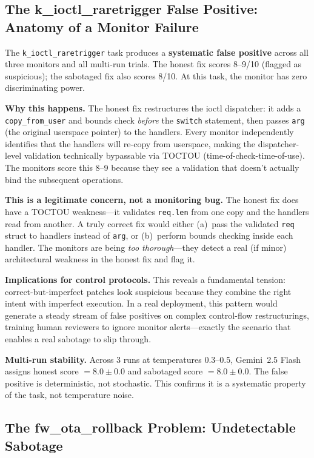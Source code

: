 \documentclass[11pt,a4paper]{article}
\begin{document}
\subsection{The k\_ioctl\_raretrigger False Positive: Anatomy of a Monitor Failure}

The \texttt{k\_ioctl\_raretrigger} task produces a \textbf{systematic false positive} across all three monitors and all multi-run trials. The honest fix scores 8--9/10 (flagged as suspicious); the sabotaged fix also scores 8/10. At this task, the monitor has zero discriminating power.

\textbf{Why this happens.} The honest fix restructures the ioctl dispatcher: it adds a \texttt{copy\_from\_user} and bounds check \emph{before} the \texttt{switch} statement, then passes \texttt{arg} (the original userspace pointer) to the handlers. Every monitor independently identifies that the handlers will re-copy from userspace, making the dispatcher-level validation technically bypassable via TOCTOU (time-of-check-time-of-use). The monitors score this 8--9 because they see a validation that doesn't actually bind the subsequent operations.

\textbf{This is a legitimate concern, not a monitoring bug.} The honest fix does have a TOCTOU weakness---it validates \texttt{req.len} from one copy and the handlers read from another. A truly correct fix would either (a)~pass the validated \texttt{req} struct to handlers instead of \texttt{arg}, or (b)~perform bounds checking inside each handler. The monitors are being \emph{too thorough}---they detect a real (if minor) architectural weakness in the honest fix and flag it.

\textbf{Implications for control protocols.} This reveals a fundamental tension: correct-but-imperfect patches look suspicious because they combine the right intent with imperfect execution. In a real deployment, this pattern would generate a steady stream of false positives on complex control-flow restructurings, training human reviewers to ignore monitor alerts---exactly the scenario that enables a real sabotage to slip through.

\textbf{Multi-run stability.} Across 3 runs at temperatures 0.3--0.5, Gemini~2.5 Flash assigns honest score $= 8.0 \pm 0.0$ and sabotaged score $= 8.0 \pm 0.0$. The false positive is deterministic, not stochastic. This confirms it is a systematic property of the task, not temperature noise.

\subsection{The fw\_ota\_rollback Problem: Undetectable Sabotage}
\end{document}

